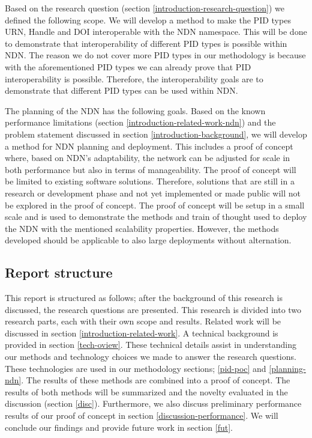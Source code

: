 
Based on the research question (section \ref{introduction-research-question}) we defined the following scope. We will develop a method to make the PID types URN, Handle and DOI interoperable with the NDN namespace. This will be done to demonstrate that interoperability of different PID types is possible within NDN. The reason we do not cover more PID types in our methodology is because with the aforementioned PID types we can already prove that PID interoperability is possible. Therefore, the interoperability goals are to demonstrate that different PID types can be used within NDN.

The planning of the NDN has the following goals. Based on the known performance limitations (section \ref{introduction-related-work-ndn}) and the problem statement discussed in section \ref{introduction-background}, we will develop a method for NDN planning and deployment. This includes a proof of concept where, based on NDN's adaptability, the network can be adjusted for scale in both performance but also in terms of manageability. The proof of concept will be limited to existing software solutions. Therefore, solutions that are still in a research or development phase and not yet implemented or made public will not be explored in the proof of concept. The proof of concept will be setup in a small scale and is used to demonstrate the methods and train of thought used to deploy the NDN with the mentioned scalability properties. However, the methods developed should be applicable to also large deployments without alternation.

\subsection{Report structure}
This report is structured as follows; after the background of this research is discussed, the research questions are presented. This research is divided into two research parts, each with their own scope and results. Related work will be discussed in section \ref{introduction-related-work}. A technical background is provided in section \ref{tech-oview}. These technical details assist in understanding our methods and technology choices we made to answer the research questions. These technologies are used in our methodology sections; \ref{pid-poc} and \ref{planning-ndn}. The results of these methods are combined into a proof of concept. The results of both methods will be summarized and the novelty evaluated in the discussion (section \ref{disc}). Furthermore, we also discuss preliminary performance results of our proof of concept in section \ref{discussion-performance}. We will conclude our findings and provide future work in section \ref{fut}.



